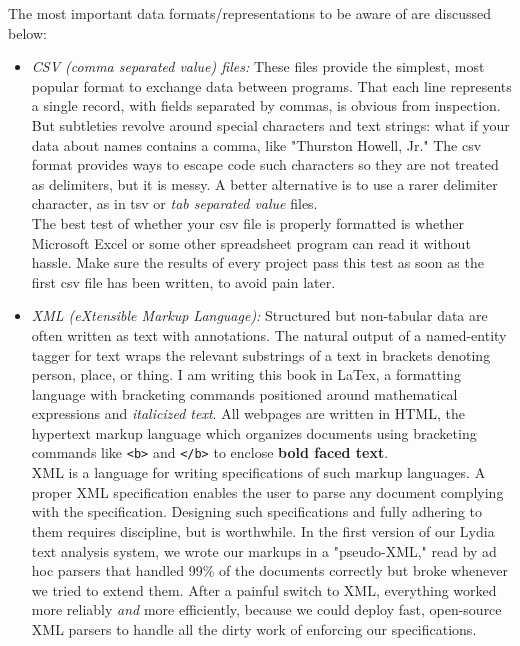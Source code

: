 \documentclass[10pt]{article}
\begin{document}
The most important data formats/representations to be aware of are discussed below:
\begin{itemize}
  \item \textit{CSV (comma separated value) files:} These files provide the simplest, most popular format to exchange data between programs. That each line represents a single record, with fields separated by commas, is obvious from inspection. But subtleties revolve around special characters and text strings: what if your data about names contains a comma, like "Thurston Howell, Jr." The csv format provides ways to escape code such characters so they are not treated as delimiters, but it is messy. A better alternative is to use a rarer delimiter character, as in tsv or \textit{tab separated value} files.\\
The best test of whether your csv file is properly formatted is whether Microsoft Excel or some other spreadsheet program can read it without hassle. Make sure the results of every project pass this test as soon as the first csv file has been written, to avoid pain later.
  
  \item \textit{XML (eXtensible Markup Language):} Structured but non-tabular data are often written as text with annotations. The natural output of a named-entity tagger for text wraps the relevant substrings of a text in brackets denoting person, place, or thing. I am writing this book in LaTex, a formatting language with bracketing commands positioned around mathematical expressions and \textit{italicized text}. All webpages are written in HTML, the hypertext markup language which organizes documents using bracketing commands like \texttt{<b>} and \texttt{</b>} to enclose \textbf{bold faced text}.\\
XML is a language for writing specifications of such markup languages. A proper XML specification enables the user to parse any document complying with the specification. Designing such specifications and fully adhering to them requires discipline, but is worthwhile. In the first version of our Lydia text analysis system, we wrote our markups in a "pseudo-XML," read by ad hoc parsers that handled 99\% of the documents correctly but broke whenever we tried to extend them. After a painful switch to XML, everything worked more reliably \textit{and} more efficiently, because we could deploy fast, open-source XML parsers to handle all the dirty work of enforcing our specifications.
  

\end{itemize}
\end{document}
